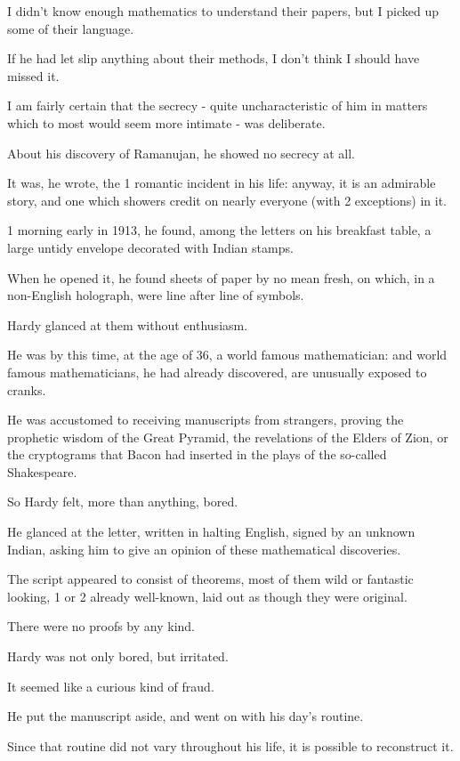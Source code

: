 \documentclass{article}
\numberwithin{equation}{section}
\begin{document}
I didn't know enough mathematics to understand their papers, but I picked up some of their language.

If he had let slip anything about their methods, I don't think I should have missed it.

I am fairly certain that the secrecy - quite uncharacteristic of him in matters which to most would seem more intimate - was deliberate.

%
About his discovery of Ramanujan, he showed no secrecy at all.

It was, he wrote, the 1 romantic incident in his life: anyway, it is an admirable story, and one which showers credit on nearly everyone (with 2 exceptions) in it.

1 morning early in 1913, he found, among the letters on his breakfast table, a large untidy envelope decorated with Indian stamps.

When he opened it, he found sheets of paper by no mean fresh, on which, in a non-English holograph, were line after line of symbols.

Hardy glanced at them without enthusiasm.

He was by this time, at the age of 36, a world famous mathematician: and world famous mathematicians, he had already discovered, are unusually exposed to cranks.

He was accustomed to receiving manuscripts from strangers, proving the prophetic wisdom of the Great Pyramid, the revelations of the Elders of Zion, or the cryptograms that Bacon had inserted in the plays of the so-called Shakespeare.

%
So Hardy felt, more than anything, bored.

He glanced at the letter, written in halting English, signed by an unknown Indian, asking him to give an opinion of these mathematical discoveries.

The script appeared to consist of theorems, most of them wild or fantastic looking, 1 or 2 already well-known, laid out as though they were original.

There were no proofs by any kind.

Hardy was not only bored, but irritated.

It seemed like a curious kind of fraud.

He put the manuscript aside, and went on with his day's routine.

Since that routine did not vary throughout his life, it is possible to reconstruct it.
\end{document}
